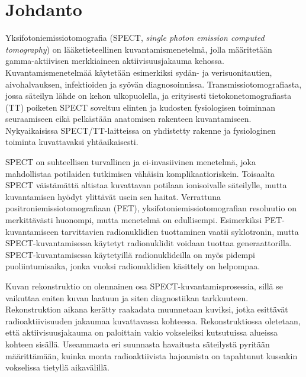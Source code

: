 \section{Johdanto}
Yksifotoniemissiotomografia (SPECT, \textit{single photon emission computed tomography}) on lääketieteellinen kuvantamismenetelmä, jolla määritetään gamma-aktiivisen merkkiaineen aktiivisuusjakauma kehossa\cite{bruyant_analytic_2002}. Kuvantamismenetelmää käytetään esimerkiksi sydän- ja verisuonitautien, aivohalvauksen, infektioiden ja syövän diagnosoinnissa.\cite{cherry_single_2012, van_audenhaege_review_2015, crisan_radiopharmaceuticals_2022} Transmissiotomografiasta, jossa säteilyn lähde on kehon ulkopuolella\cite{bercovich_medical_2018}, ja erityisesti tietokonetomografiasta (TT) poiketen SPECT soveltuu elinten ja kudosten fysiologisen toiminnan seuraamiseen eikä pelkästään anatomisen rakenteen kuvantamiseen\cite{bercovich_medical_2018, crisan_radiopharmaceuticals_2022, cherry_single_2012}. Nykyaikaisissa SPECT/TT-laitteissa on yhdistetty rakenne ja fysiologinen toiminta kuvattavaksi yhtäaikaisesti\cite{hutton_origins_2014, cherry_single_2012, bercovich_medical_2018}.

SPECT on suhteellisen turvallinen ja ei-invasiivinen menetelmä, joka mahdollistaa potilaiden tutkimisen vähäisin komplikaatioriskein. Toisaalta SPECT väistämättä altistaa kuvattavan potilaan ionisoivalle säteilylle, mutta kuvantamisen hyödyt ylittävät usein sen haitat. Verrattuna positroniemissiotomografiaan (PET), yksifotoniemissiotomografian resoluutio on merkittävästi huonompi, mutta menetelmä on edullisempi\cite{crisan_radiopharmaceuticals_2022, cherry_single_2012}. Esimerkiksi PET-kuvantamiseen tarvittavien radionuklidien tuottaminen vaatii syklotronin, mutta SPECT-kuvantamisessa käytetyt radionuklidit voidaan tuottaa generaattorilla. SPECT-kuvantamisessa käytetyillä radionuklideilla on myös pidempi puoliintumisaika, jonka vuoksi radionuklidien käsittely on helpompaa.\cite{crisan_radiopharmaceuticals_2022}

Kuvan rekonstruktio on olennainen osa SPECT-kuvantamisprosessia, sillä se vaikuttaa eniten kuvan laatuun ja siten diagnostiikan tarkkuuteen. Rekonstruktion aikana kerätty raakadata muunnetaan kuviksi, jotka esittävät radioaktiivisuuden jakaumaa kuvattavassa kohteessa. Rekonstruktiossa oletetaan, että aktiivisuusjakauma on paloittain vakio vokseleiksi kutsutuissa alueissa kohteen sisällä. Useammasta eri suunnasta havaitusta säteilystä pyritään määrittämään, kuinka monta radioaktiivista hajoamista on tapahtunut kussakin vokselissa tietyllä aikavälillä.\cite{bruyant_analytic_2002}

